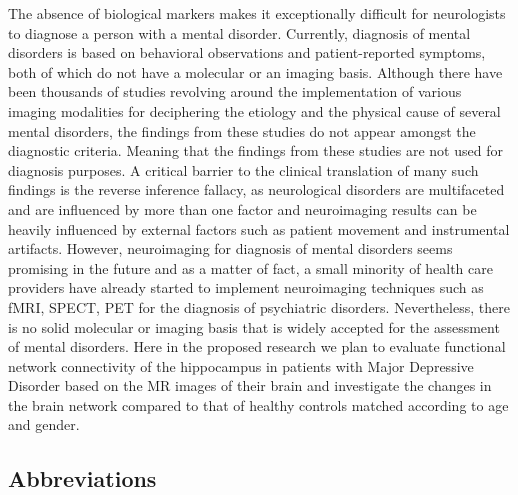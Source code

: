 ﻿\documentclass[12pt]{article}
\begin{document}
The absence of biological markers makes it exceptionally difficult for
neurologists to diagnose a person with a mental disorder. Currently,
diagnosis of mental disorders is based on behavioral observations and
patient-reported symptoms, both of which do not have a molecular or an
imaging basis. Although there have been thousands of studies revolving
around the implementation of various imaging modalities for
deciphering the etiology and the physical cause of several mental
disorders, the findings from these studies do not appear amongst the
diagnostic criteria. Meaning that the findings from these studies are
not used for diagnosis purposes. A critical barrier to the clinical
translation of many such findings is the reverse inference fallacy, as
neurological disorders are multifaceted and are influenced by more
than one factor and neuroimaging results can be heavily influenced by
external factors such as patient movement and instrumental
artifacts. However, neuroimaging for diagnosis of mental disorders
seems promising in the future and as a matter of fact, a small
minority of health care providers have already started to implement
neuroimaging techniques such as fMRI, SPECT, PET for the diagnosis of
psychiatric disorders. Nevertheless, there is no solid molecular or
imaging basis that is widely accepted for the assessment of mental
disorders. Here in the proposed research we plan to evaluate
functional network connectivity of the hippocampus in patients with
Major Depressive Disorder based on the MR images of their brain and
investigate the changes in the brain network compared to that of
healthy controls matched according to age and gender.
\newpage

\thispagestyle{empty}
\listoffigures

\thispagestyle{empty}
\listoftables
\newpage


\begin{center}
  \section*{Abbreviations}
\end{center}
\end{document}
